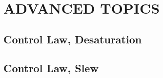 \section{\Large ADVANCED TOPICS}
\subsection{Control Law, Desaturation}

\subsection{Control Law, Slew}